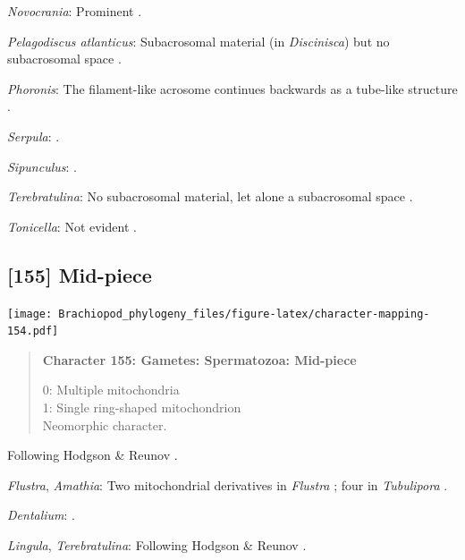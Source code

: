 \documentclass[openany]{book}
\begin{document}
\hypertarget{Novocrania-coding-154}{}
\emph{Novocrania}: Prominent \citep{Afzelius1978Finestructure}.

\hypertarget{Pelagodiscus_atlanticus-coding-154}{}
\emph{Pelagodiscus atlanticus}: Subacrosomal material (in
\emph{Discinisca}) but no subacrosomal space
\citep{Hodgson1994Ultrastructureof}.

\hypertarget{Phoronis-coding-154}{}
\emph{Phoronis}: The filament-like acrosome continues backwards as a
tube-like structure \citep[summarized in
\citet{Jamieson1991FishEvolution}]{Franzen1980Ultrastructureof}.

\hypertarget{Serpula-coding-154}{}
\emph{Serpula}: \citet{Gherardi2011}.

\hypertarget{Sipunculus-coding-154}{}
\emph{Sipunculus}: \citet{Rice1993}.

\hypertarget{Terebratulina-coding-154}{}
\emph{Terebratulina}: No subacrosomal material, let alone a subacrosomal
space \citep[e.g.][]{Hodgson1994Ultrastructureof}.

\hypertarget{Tonicella-coding-154}{}
\emph{Tonicella}: Not evident \citep{BucklandNicks1988}.

\subsection*{{[}155{]} Mid-piece}\label{mid-piece}

\texttt{[image: Brachiopod\_phylogeny\_files/figure-latex/character-mapping-154.pdf]}

\begin{quote}
\textbf{Character 155: Gametes: Spermatozoa: Mid-piece}

0: Multiple mitochondria\\
1: Single ring-shaped mitochondrion\\
Neomorphic character.
\end{quote}

Following Hodgson \& Reunov \citeyearpar{Hodgson1994Ultrastructureof}.

\hypertarget{Amathia-coding-155}{}
\emph{Flustra}, \emph{Amathia}: Two mitochondrial derivatives in
\emph{Flustra} \citep{Franzen1981, Franzen1977}; four in
\emph{Tubulipora} \citep{Franzen1984}.

\hypertarget{Dentalium-coding-155}{}
\emph{Dentalium}: \citet{DufresneDube1983}.

\hypertarget{Lingula-coding-155}{}
\emph{Lingula}, \emph{Terebratulina}: Following Hodgson \& Reunov
\citeyearpar{Hodgson1994Ultrastructureof}.
\end{document}
